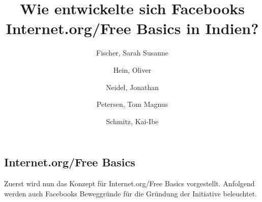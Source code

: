 \documentclass{article}
\title{Wie entwickelte sich Facebooks Internet.org/Free Basics in Indien?}
\author{
  Fischer, Sarah Susanne\\
  \and
  Hein, Oliver\\
  \and
  Neidel, Jonathan\\
  \and
  Petersen, Tom Magnus\\
  \and
  Schmitz, Kai-Ibe\\
}
\begin{document}
\maketitle

\subsection{Internet.org/Free Basics}

Zuerst wird nun das Konzept für Internet.org/Free Basics vorgestellt.
Anfolgend werden auch Facebooks Beweggründe für die Gründung der Initiative beleuchtet.

\end{document}
